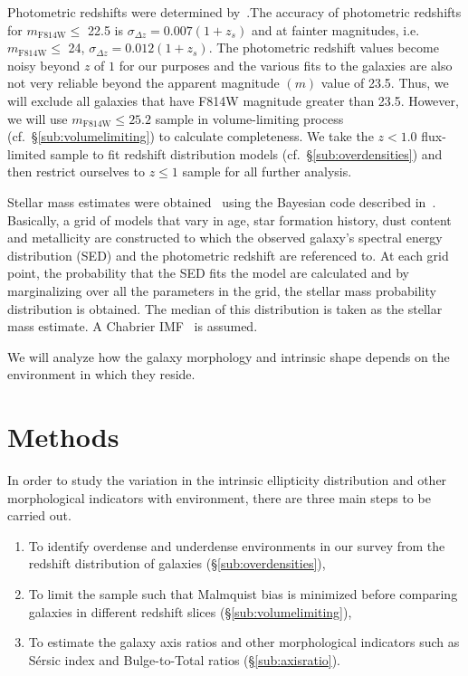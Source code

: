 \documentclass[twocolumn,useAMS,usenatbib]{mn2e}
\newcommand{\rachel}[1]{{\textcolor{red}{#1}}}
\newcommand{\sersic}{S\'{e}rsic }
\begin{document}
Photometric redshifts were determined by~\cite{COSMOS_Photoz_30band}.The accuracy of photometric redshifts for $m_\text{F814W}\le$ 22.5 is $\sigma_{\Delta z} = 0.007(1+z_s)$ and at fainter magnitudes, i.e. $m_\text{F814W}\le$ 24, $\sigma_{\Delta z} = 0.012(1+z_s)$.
The photometric redshift values become noisy beyond $z$ of $1$ for our purposes and the various fits to the galaxies are also not very reliable beyond the apparent magnitude $(m)$ value of 23.5. 
Thus, we will exclude all galaxies that have F814W magnitude greater than 23.5. However, we will use $m_\text{F814W}\le 25.2$ sample in volume-limiting process (cf.~\S\ref{sub:volumelimiting}) to calculate completeness.  We take the $z<1.0$ flux-limited sample to fit redshift distribution models (cf.~\S\ref{sub:overdensities}) and then restrict ourselves to $z\le1$ sample for all further analysis.

Stellar mass estimates were obtained~\citep{COSMOS_XRAY} using the Bayesian code described in~\cite{KEVIN_MSTAR}. Basically, a grid of models that vary in age, star formation history, dust content and metallicity
are constructed to which the observed galaxy's spectral energy distribution (SED) and the photometric redshift are referenced to. At each grid point, the probability that the 
SED fits the model are calculated and by marginalizing over all the parameters in the grid, the stellar mass probability distribution is obtained. The median of this distribution
is taken as the stellar mass estimate. A Chabrier IMF~\citep{ChabrierIMF} is assumed.
  
We will analyze how the galaxy morphology and intrinsic shape depends on
the environment in which they reside.

\section{Methods}
\label{S:methods}

In order to study the variation in the intrinsic ellipticity distribution and other morphological indicators with environment, there are three main steps to be carried out.
\begin{enumerate}
 \item To identify overdense and underdense environments in our survey from the redshift distribution of galaxies (\S\ref{sub:overdensities}),
 \item To limit the sample such that Malmquist bias is minimized before comparing galaxies in different redshift slices (\S\ref{sub:volumelimiting}),
 \item To estimate the galaxy axis ratios and other morphological indicators such as  \sersic index and Bulge-to-Total ratios (\S\ref{sub:axisratio}).
\end{enumerate}
\end{document}
